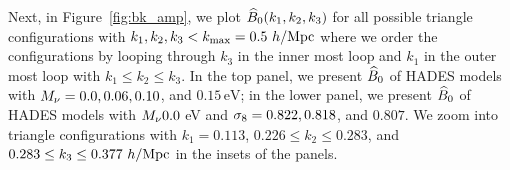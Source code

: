 Next, in Figure~\ref{fig:bk_amp}, we plot $\widehat{B}_0(k_1, k_2, k_3)$ for all possible triangle 
configurations with $k_1, k_2, k_3 < k_{\rm max} = 0.5~h/{\rm Mpc}$ where we order the 
configurations by looping through $k_3$ in the inner most loop and $k_1$ in the outer most 
loop with $k_1 \leq k_2 \leq k_3$. In the top panel, we present $\widehat{B}_0$ of HADES models 
with $M_\nu = 0.0, 0.06, 0.10$, and $0.15\,\mathrm{eV}$; in the lower panel, we present 
$\widehat{B}_0$ of HADES models with $M_\nu 0.0$ eV and $\sigma_8 = 0.822, 0.818$, and $0.807$. We 
zoom into triangle configurations with $k_1 = 0.113$, $0.226 \leq k_2 \leq 0.283$, 
and $0.283 \leq k_3 \leq 0.377~h/{\rm Mpc}$ in the insets of the panels. 
